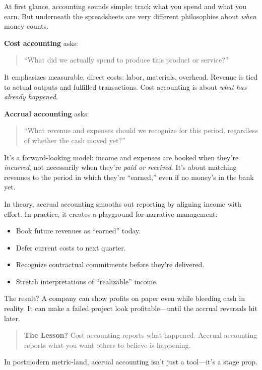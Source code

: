 \begin{tcolorbox}[colback=blue!5!white, colframe=blue!50!black, breakable,
  title={Historical Sidebar: Counting the Same Money Twice — Cost Accounting vs. Accrual Accounting}]

At first glance, accounting sounds simple: track what you spend and what you earn.  
But underneath the spreadsheets are very different philosophies about \textit{when} money counts.

\medskip

\textbf{Cost accounting} asks:  
\begin{quote}
“What did we actually spend to produce this product or service?”
\end{quote}
It emphasizes measurable, direct costs: labor, materials, overhead.  
Revenue is tied to actual outputs and fulfilled transactions.  
Cost accounting is about \textit{what has already happened}.

\medskip

\textbf{Accrual accounting} asks:  
\begin{quote}
“What revenue and expenses should we recognize for this period, regardless of whether the cash moved yet?”
\end{quote}
It’s a forward-looking model: income and expenses are booked when they’re \textit{incurred}, not necessarily when they’re \textit{paid or received}.  
It’s about matching revenues to the period in which they’re “earned,” even if no money’s in the bank yet.

\medskip

In theory, accrual accounting smooths out reporting by aligning income with effort.  
In practice, it creates a playground for narrative management:
\begin{itemize}
    \item Book future revenues as “earned” today.
    \item Defer current costs to next quarter.
    \item Recognize contractual commitments before they’re delivered.
    \item Stretch interpretations of “realizable” income.
\end{itemize}

\medskip

The result?  
A company can show profits on paper even while bleeding cash in reality.  
It can make a failed project look profitable—until the accrual reversals hit later.

\medskip

\begin{quote}
\textbf{The Lesson?} Cost accounting reports what happened. Accrual accounting reports what you want others to believe is happening.
\end{quote}

In postmodern metric-land, accrual accounting isn’t just a tool—it’s a stage prop.
\end{tcolorbox}


